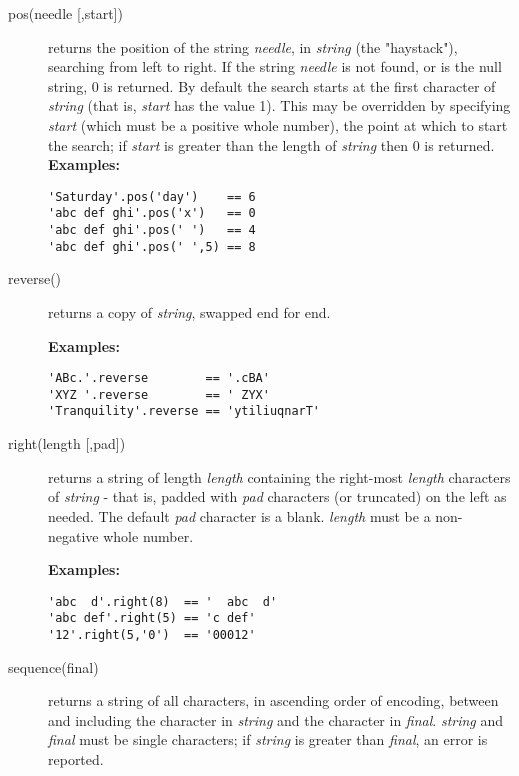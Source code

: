 \begin{description}
\item[pos(needle [,start{]})]\label{refpos}
returns the position of the string \emph{needle}, in
\emph{string} (the "haystack"), searching from left to right.
If the string \emph{needle} is not found, or is the null string,
0 is returned.
By default the search starts at the first character of
\emph{string} (that is, \emph{start} has the value 1).
This may be overridden by specifying \emph{start} (which must be a
positive whole number), the point at which to start the search; if
\emph{start} is greater than the length of \emph{string} then 0
is returned.
 \textbf{Examples:}
\begin{lstlisting}
'Saturday'.pos('day')    == 6
'abc def ghi'.pos('x')   == 0
'abc def ghi'.pos(' ')   == 4
'abc def ghi'.pos(' ',5) == 8
\end{lstlisting}

\item[reverse()]\label{refreverse}
returns a copy of \emph{string}, swapped end for end.
 
\textbf{Examples:}
\begin{lstlisting}
'ABc.'.reverse        == '.cBA'
'XYZ '.reverse        == ' ZYX'
'Tranquility'.reverse == 'ytiliuqnarT'
\end{lstlisting}

\item[right(length [,pad{]})]\label{refright}

returns a string of length \emph{length} containing the
right-most \emph{length} characters of \emph{string} -
that is, padded with \emph{pad} characters (or truncated) on the
left as needed.  The default \emph{pad} character is a blank.
\emph{length} must be a non-negative whole number.
 
\textbf{Examples:}
\begin{lstlisting}
'abc  d'.right(8)  == '  abc  d'
'abc def'.right(5) == 'c def'
'12'.right(5,'0')  == '00012'
\end{lstlisting}

\item[sequence(final)]\label{refsequen}
 returns a string of all characters, in ascending order of encoding,
between and including the character in \emph{string} and the
character in \emph{final}.
\emph{string} and \emph{final} must be single characters;
if \emph{string} is greater than \emph{final}, an error is
reported.
 

\end{description}
